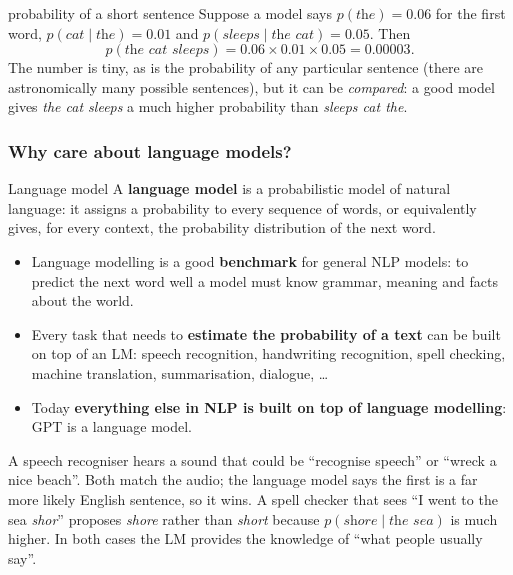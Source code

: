 \begin{nbexample}{probability of a short sentence}
\notinslides
Suppose a model says $p(\textit{the}) = 0.06$ for the first word,
$p(\textit{cat} \mid \textit{the}) = 0.01$ and
$p(\textit{sleeps} \mid \textit{the cat}) = 0.05$. Then
\[
  p(\textit{the cat sleeps}) = 0.06 \times 0.01 \times 0.05 = 0.00003 .
\]
The number is tiny, as is the probability of any particular sentence (there are
astronomically many possible sentences), but it can be \emph{compared}: a good model
gives \emph{the cat sleeps} a much higher probability than \emph{sleeps cat the}.
\end{nbexample}

\subsubsection{Why care about language models?}

\begin{nbdef}{Language model}
A \textbf{language model} is a probabilistic model of natural language: it assigns a
probability to every sequence of words, or equivalently gives, for every context, the
probability distribution of the next word.
\end{nbdef}

\begin{itemize}[nosep]
  \item Language modelling is a good \textbf{benchmark} for general NLP models: to
        predict the next word well a model must know grammar, meaning and facts about
        the world.
  \item Every task that needs to \textbf{estimate the probability of a text} can be
        built on top of an LM: speech recognition, handwriting recognition, spell
        checking, machine translation, summarisation, dialogue, \ldots
  \item Today \textbf{everything else in NLP is built on top of language modelling}:
        GPT is a language model.
\end{itemize}

\begin{nbintuition}
\notinslides
A speech recogniser hears a sound that could be ``recognise speech'' or ``wreck a nice
beach''. Both match the audio; the language model says the first is a far more likely
English sentence, so it wins. A spell checker that sees ``I went to the sea \emph{shor}''
proposes \emph{shore} rather than \emph{short} because $p(\textit{shore} \mid
\textit{the sea})$ is much higher. In both cases the LM provides the knowledge of
``what people usually say''.
\end{nbintuition}
